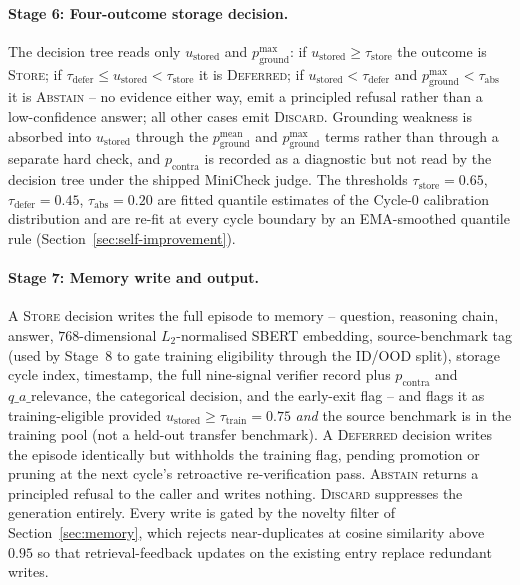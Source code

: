 \paragraph{Stage 6: Four-outcome storage decision.}
The decision tree reads only $u_{\text{stored}}$ and $p_{\text{ground}}^{\max}$: if $u_{\text{stored}} \geq \tau_{\text{store}}$ the outcome is \textsc{Store}; if $\tau_{\text{defer}} \leq u_{\text{stored}} < \tau_{\text{store}}$ it is \textsc{Deferred}; if $u_{\text{stored}} < \tau_{\text{defer}}$ and $p_{\text{ground}}^{\max} < \tau_{\text{abs}}$ it is \textsc{Abstain} -- no evidence either way, emit a principled refusal rather than a low-confidence answer; all other cases emit \textsc{Discard}. Grounding weakness is absorbed into $u_{\text{stored}}$ through the $p_{\text{ground}}^{\text{mean}}$ and $p_{\text{ground}}^{\max}$ terms rather than through a separate hard check, and $p_{\text{contra}}$ is recorded as a diagnostic but not read by the decision tree under the shipped MiniCheck judge. The thresholds $\tau_{\text{store}} = 0.65$, $\tau_{\text{defer}} = 0.45$, $\tau_{\text{abs}} = 0.20$ are fitted quantile estimates of the Cycle-0 calibration distribution and are re-fit at every cycle boundary by an EMA-smoothed quantile rule (Section~\ref{sec:self-improvement}).

\paragraph{Stage 7: Memory write and output.}
A \textsc{Store} decision writes the full episode to memory -- question, reasoning chain, answer, $768$-dimensional $L_{2}$-normalised SBERT embedding, source-benchmark tag (used by Stage~8 to gate training eligibility through the ID/OOD split), storage cycle index, timestamp, the full nine-signal verifier record plus $p_{\text{contra}}$ and $q\_a\_\text{relevance}$, the categorical decision, and the early-exit flag -- and flags it as training-eligible provided $u_{\text{stored}} \geq \tau_{\text{train}} = 0.75$ \emph{and} the source benchmark is in the training pool (not a held-out transfer benchmark). A \textsc{Deferred} decision writes the episode identically but withholds the training flag, pending promotion or pruning at the next cycle's retroactive re-verification pass. \textsc{Abstain} returns a principled refusal to the caller and writes nothing. \textsc{Discard} suppresses the generation entirely. Every write is gated by the novelty filter of Section~\ref{sec:memory}, which rejects near-duplicates at cosine similarity above $0.95$ so that retrieval-feedback updates on the existing entry replace redundant writes.

